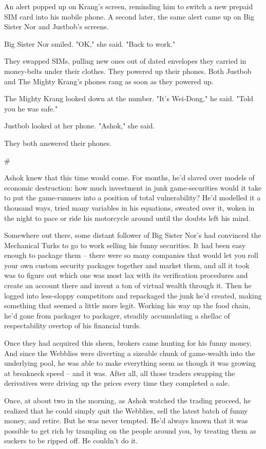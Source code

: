 An alert popped up on Krang's screen, reminding him to switch a new
prepaid SIM card into his mobile phone. A second later, the same
alert came up on Big Sister Nor and Justbob's screens.

Big Sister Nor smiled. "OK," she said. "Back to work."

They swapped SIMs, pulling new ones out of dated envelopes they
carried in money-belts under their clothes. They powered up their
phones. Both Justbob and The Mighty Krang's phones rang as soon as
they powered up.

The Mighty Krang looked down at the number. "It's Wei-Dong," he
said. "Told you he was safe."

Justbob looked at her phone. "Ashok," she said.

They both answered their phones.

\#

Ashok knew that this time would come. For months, he'd slaved over
models of economic destruction: how much investment in junk
game-securities would it take to put the game-runners into a
position of total vulnerability? He'd modelled it a thousand ways,
tried many variables in his equations, sweated over it, woken in
the night to pace or ride his motorcycle around until the doubts
left his mind.

Somewhere out there, some distant follower of Big Sister Nor's had
convinced the Mechanical Turks to go to work selling his funny
securities. It had been easy enough to package them -- there were
so many companies that would let you roll your own custom security
packages together and market them, and all it took was to figure
out which one was most lax with its verification procedures and
create an account there and invent a ton of virtual wealth through
it. Then he logged into less-sloppy competitors and repackaged the
junk he'd created, making something that seemed a little more
legit. Working his way up the food chain, he'd gone from packager
to packager, steadily accumulating a shellac of respectability
overtop of his financial turds.

Once they had acquired this sheen, brokers came hunting for his
funny money. And since the Webblies were diverting a sizeable chunk
of game-wealth into the underlying pool, he was able to make
everything seem as though it was growing at breakneck speed -- and
it was. After all, all those traders swapping the derivatives were
driving up the prices every time they completed a sale.

Once, at about two in the morning, as Ashok watched the trading
proceed, he realized that he could simply quit the Webblies, sell
the latest batch of funny money, and retire. But he was never
tempted. He'd always known that it was possible to get rich by
trampling on the people around you, by treating them as suckers to
be ripped off. He couldn't do it.

